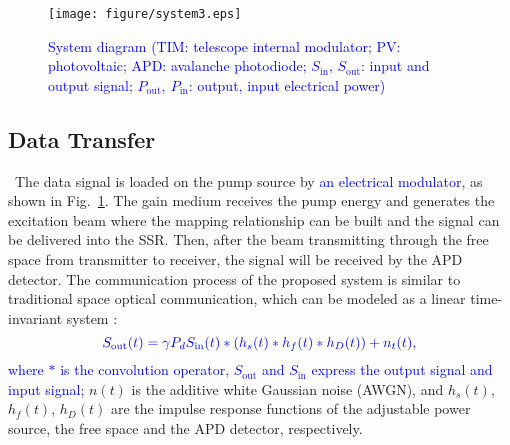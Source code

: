\documentclass{IEEEtran}
\begin{document}

\begin{figure}[t] 
	\centering
	\texttt{[image: figure/system3.eps]}
	\caption{\textcolor{blue}{System diagram (TIM: telescope internal modulator; PV: photovoltaic; APD: avalanche photodiode; $S_\mathrm{in}$, $S_\mathrm{out}$: input and output signal; $P_\mathrm{out},~P_\mathrm{in}$: output, input electrical power)}}
	\label{ops-vecsle}
\end{figure}
\subsection{Data Transfer}\
The data signal is loaded on the pump source by \textcolor{blue}{an electrical modulator}, as shown in Fig.~\ref{ops-vecsle}.
The gain medium receives the pump energy and generates the excitation beam where the mapping relationship can be built and the signal can be delivered into the SSR. Then, after the beam transmitting through the free space from transmitter to receiver, the signal will be received by the APD detector. 
The communication process of the proposed system is similar to traditional space optical communication, which can be modeled as a linear time-invariant system \cite{al2018optical}: 
\begin{equation}
\label{signal}
   \textcolor{blue}{ S_\mathrm{out}(t)=\gamma P_dS_\mathrm{in}(t)\ast (h_{s}(t)\ast h_{f}(t)\ast h_{D}(t)) +n_t(t),}
\end{equation}
\textcolor{blue}{where $\ast$ is the convolution operator, $S_\mathrm{out}$ and $S_\mathrm{in}$ express the output signal and input signal;}
$n(t)$ is the additive white Gaussian noise (AWGN), and $h_{s}(t)$, $h_f(t)$, $h_{D}(t)$ are the impulse response functions of the adjustable power source, the free space and the APD detector, respectively. %
\end{document}
